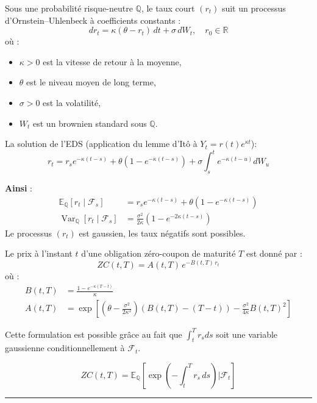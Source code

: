 \begin{f}
	
	Sous une probabilité risque-neutre $\mathbb{Q}$, le taux court $(r_t)$ suit un processus d’Ornstein–Uhlenbeck à coefficients constants :
	\[
	dr_t = \kappa(\theta - r_t)\, dt + \sigma\, dW_t, \quad r_0 \in \mathbb{R}
	\]
	où :
	\begin{itemize}[nosep]
		\item $\kappa > 0$ est la vitesse de retour à la moyenne,
		\item $\theta$ est le niveau moyen de long terme,
		\item $\sigma > 0$ est la volatilité,
		\item $W_t$ est un brownien standard sous $\mathbb{Q}$.
	\end{itemize}
	
La solution de l’EDS (application du lemme d'Itô à $Y_{t}=r(t) e^{\kappa t}$):
	\[
	r_t = r_s e^{-\kappa(t-s)} + \theta(1 - e^{-\kappa(t-s)}) + \sigma \int_s^t e^{-\kappa(t-u)} dW_u
	\]
	
	\textbf{Ainsi} :
	\[
	\begin{aligned}
		\mathbb{E}_\mathbb{Q}[r_t \mid \mathcal{F}_s] &= r_s e^{-\kappa(t-s)} + \theta(1 - e^{-\kappa(t-s)}) \\
		\operatorname{Var}_\mathbb{Q}[r_t \mid \mathcal{F}_s] &= \frac{\sigma^2}{2\kappa} \left(1 - e^{-2\kappa(t-s)}\right)
	\end{aligned}
	\]
Le processus $(r_t)$ est gaussien, les taux négatifs sont possibles.
	
\end{f}

\begin{f}

Le prix à l’instant $t$ d’une obligation zéro-coupon de maturité $T$ est donné par :
\[
ZC(t, T) = A(t, T) \, e^{-B(t, T)\, r_t}
\]
où :
\[
\begin{aligned}
	B(t, T) &= \frac{1 - e^{-\kappa(T - t)}}{\kappa} \\
	A(t, T) &= \exp \left[ \left(\theta - \frac{\sigma^2}{2\kappa^2}\right) (B(t, T) - (T - t)) - \frac{\sigma^2}{4\kappa} B(t, T)^2 \right]
\end{aligned}
\]

Cette formulation est possible grâce au fait que $\int_t^T r_s ds$ soit une variable gaussienne conditionnellement à $\mathcal{F}_t$.

\[
ZC(t, T) = \mathbb{E}_\mathbb{Q} \left[ \exp\left( -\int_t^T r_s\, ds \right) \Big| \mathcal{F}_t \right]
\]

\end{f}
\hrule

